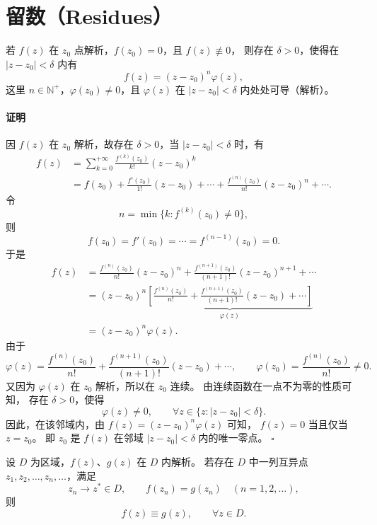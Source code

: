 \setcounter{section}{4}
\section{留数（Residues）}

\begin{proposition}[解析函数零点的孤立性]
若 $f(z)$ 在 $z_0$ 点解析，$f(z_0)=0$，且 $f(z)\not\equiv 0$，
则存在 $\delta>0$，使得在 $|z-z_0|<\delta$ 内有
\[
  f(z)=(z-z_0)^n\varphi(z),
\]
这里 $n\in\mathbb{N}^{+}$，$\varphi(z_0)\ne 0$，且
$\varphi(z)$ 在 $|z-z_0|<\delta$ 内处处可导（解析）。
\end{proposition}

\paragraph{证明}
因 $f(z)$ 在 $z_0$ 解析，故存在 $\delta>0$，当 $|z-z_0|<\delta$ 时，有
\begin{align*}
  f(z)
  &=\sum_{k=0}^{+\infty}\frac{f^{(k)}(z_0)}{k!}(z-z_0)^k \\
  &=f(z_0)+\frac{f'(z_0)}{1!}(z-z_0)+\cdots
    +\frac{f^{(n)}(z_0)}{n!}(z-z_0)^n+\cdots.
\end{align*}
令
\[
  n=\min\bigl\{k: f^{(k)}(z_0)\ne 0\bigr\},
\]
则
\[
  f(z_0)=f'(z_0)=\cdots=f^{(n-1)}(z_0)=0.
\]
于是
\begin{align*}
  f(z)
  &=\frac{f^{(n)}(z_0)}{n!}(z-z_0)^n
    +\frac{f^{(n+1)}(z_0)}{(n+1)!}(z-z_0)^{n+1}+\cdots \\
  &=(z-z_0)^n\underbrace{\left[
      \frac{f^{(n)}(z_0)}{n!}
      +\frac{f^{(n+1)}(z_0)}{(n+1)!}(z-z_0)+\cdots
    \right]}_{\displaystyle\varphi(z)} \\
  &=(z-z_0)^n\varphi(z).
\end{align*}
由于
\[
  \varphi(z)
  =\frac{f^{(n)}(z_0)}{n!}
    +\frac{f^{(n+1)}(z_0)}{(n+1)!}(z-z_0)+\cdots,
  \qquad
  \varphi(z_0)=\frac{f^{(n)}(z_0)}{n!}\ne 0.
\]
又因为 $\varphi(z)$ 在 $z_0$ 解析，所以在 $z_0$ 连续。
由连续函数在一点不为零的性质可知，
存在 $\delta>0$，使得
\[
  \varphi(z)\ne 0,\qquad
  \forall z\in\{z:|z-z_0|<\delta\}.
\]
因此，在该邻域内，由 $f(z)=(z-z_0)^n\varphi(z)$ 可知，
$f(z)=0$ 当且仅当 $z=z_0$。
即 $z_0$ 是 $f(z)$ 在邻域 $|z-z_0|<\delta$ 内的唯一零点。
\hfill$\square$

\begin{proposition}[解析函数唯一性定理]
设 $D$ 为区域，$f(z)$、$g(z)$ 在 $D$ 内解析。
若存在 $D$ 中一列互异点 $z_1,z_2,\ldots,z_n,\ldots$，满足
\[
  z_n\longrightarrow z^*\in D,
  \qquad f(z_n)=g(z_n)\quad(n=1,2,\ldots),
\]
则
\[
  f(z)\equiv g(z),\qquad \forall z\in D.
\]
\end{proposition}

